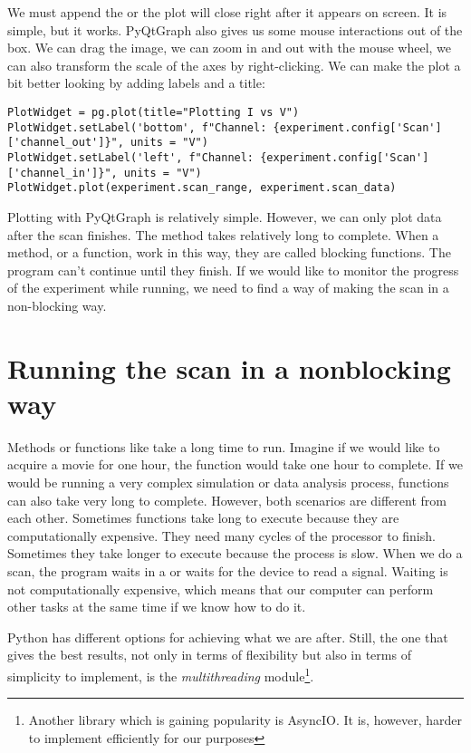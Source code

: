 We must append the  or the plot will close right after it appears on screen. It is simple, but it works. PyQtGraph also gives us some mouse interactions out of the box. We can drag the image, we can zoom in and out with the mouse wheel, we can also transform the scale of the axes by right-clicking. We can make the plot a bit better looking by adding labels and a title:

\begin{verbatim}
PlotWidget = pg.plot(title="Plotting I vs V")
PlotWidget.setLabel('bottom', f"Channel: {experiment.config['Scan']['channel_out']}", units = "V")
PlotWidget.setLabel('left', f"Channel: {experiment.config['Scan']['channel_in']}", units = "V")
PlotWidget.plot(experiment.scan_range, experiment.scan_data)
\end{verbatim}

Plotting with PyQtGraph is relatively simple. However, we can only plot data after the scan finishes. The  method takes relatively long to complete. When a method, or a function, work in this way, they are called blocking functions. The program can't continue until they finish. If we would like to monitor the progress of the experiment while running, we need to find a way of making the scan in a non-blocking way.

\section{Running the scan in a nonblocking way}\label{sec:nonblocking}
Methods or functions like  take a long time to run. Imagine if we would like to acquire a movie for one hour, the function would take one hour to complete. If we would be running a very complex simulation or data analysis process, functions can also take very long to complete. However, both scenarios are different from each other. Sometimes functions take long to execute because they are computationally expensive. They need many cycles of the processor to finish. Sometimes they take longer to execute because the process is slow. When we do a scan, the program waits in a  or waits for the device to read a signal. Waiting is not computationally expensive, which means that our computer can perform other tasks at the same time if we know how to do it.

Python has different options for achieving what we are after. Still, the one that gives the best results, not only in terms of flexibility but also in terms of simplicity to implement, is the \emph{multithreading} module\footnote{Another library which is gaining popularity is AsyncIO. It is, however, harder to implement efficiently for our purposes}.

